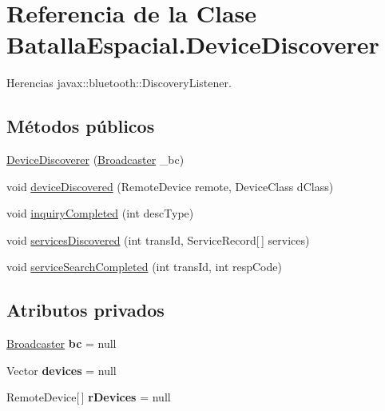 \hypertarget{classBatallaEspacial_1_1DeviceDiscoverer}{
\section{Referencia de la Clase BatallaEspacial.DeviceDiscoverer}
\label{classBatallaEspacial_1_1DeviceDiscoverer}
}


Herencias javax::bluetooth::DiscoveryListener.

\subsection*{Métodos públicos}
\begin{DoxyCompactItemize}
\item 
\hyperlink{classBatallaEspacial_1_1DeviceDiscoverer_af6ecf5a3c37bcb72e16e4e2d2711ca6e}{DeviceDiscoverer} (\hyperlink{classBatallaEspacial_1_1Broadcaster}{Broadcaster} \_\-bc)
\item 
void \hyperlink{classBatallaEspacial_1_1DeviceDiscoverer_a6cdbfd3299e1eadc9aaa2591fddacbe0}{deviceDiscovered} (RemoteDevice remote, DeviceClass dClass)
\item 
void \hyperlink{classBatallaEspacial_1_1DeviceDiscoverer_ac4d3e6cdfd825b990dcef52d85780421}{inquiryCompleted} (int descType)
\item 
void \hyperlink{classBatallaEspacial_1_1DeviceDiscoverer_aa29f2318289e2df973ebfe06430517cf}{servicesDiscovered} (int transId, ServiceRecord\mbox{[}$\,$\mbox{]} services)
\item 
void \hyperlink{classBatallaEspacial_1_1DeviceDiscoverer_a2a5c9fe8ec1fc1f578102445f4fe9ff3}{serviceSearchCompleted} (int transId, int respCode)
\end{DoxyCompactItemize}
\subsection*{Atributos privados}
\begin{DoxyCompactItemize}
\item 
\hypertarget{classBatallaEspacial_1_1DeviceDiscoverer_a9c832f493c6888299954d96e20cc01fb}{
\hyperlink{classBatallaEspacial_1_1Broadcaster}{Broadcaster} {\bfseries bc} = null}
\label{classBatallaEspacial_1_1DeviceDiscoverer_a9c832f493c6888299954d96e20cc01fb}

\item 
\hypertarget{classBatallaEspacial_1_1DeviceDiscoverer_a6d836b8d4274faaff4b0d16188c2c60f}{
Vector {\bfseries devices} = null}
\label{classBatallaEspacial_1_1DeviceDiscoverer_a6d836b8d4274faaff4b0d16188c2c60f}

\item 
\hypertarget{classBatallaEspacial_1_1DeviceDiscoverer_a8409783740775a312b7d457c6b05408a}{
RemoteDevice\mbox{[}$\,$\mbox{]} {\bfseries rDevices} = null}
\label{classBatallaEspacial_1_1DeviceDiscoverer_a8409783740775a312b7d457c6b05408a}

\end{DoxyCompactItemize}


